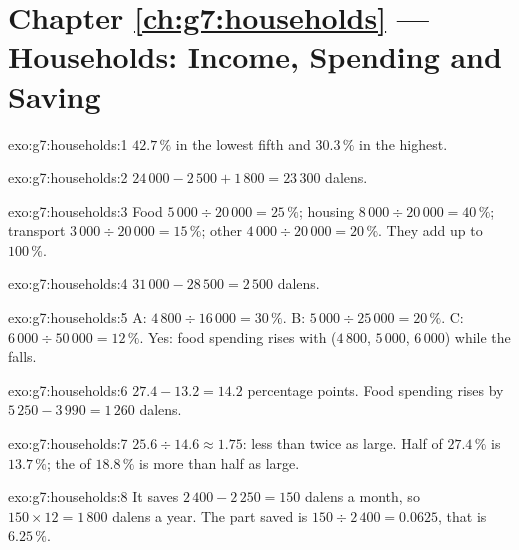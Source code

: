 \section*{Chapter \ref{ch:g7:households} --- Households: Income, Spending and Saving}

\begin{solution}{exo:g7:households:1}
$42.7\,\%$ in the lowest fifth and $30.3\,\%$ in the highest.
\end{solution}

\begin{solution}{exo:g7:households:2}
$24\,000 - 2\,500 + 1\,800 = 23\,300$ dalens.
\end{solution}

\begin{solution}{exo:g7:households:3}
Food $5\,000 \div 20\,000 = 25\,\%$; housing $8\,000 \div 20\,000 = 40\,\%$; transport
$3\,000 \div 20\,000 = 15\,\%$; other $4\,000 \div 20\,000 = 20\,\%$. They add up to $100\,\%$.
\end{solution}

\begin{solution}{exo:g7:households:4}
$31\,000 - 28\,500 = 2\,500$ dalens.
\end{solution}

\begin{solution}{exo:g7:households:5}
A: $4\,800 \div 16\,000 = 30\,\%$. B: $5\,000 \div 25\,000 = 20\,\%$. C: $6\,000 \div 50\,000 =
12\,\%$. Yes: food spending rises with  ($4\,800$, $5\,000$, $6\,000$) while the 
falls.
\end{solution}

\begin{solution}{exo:g7:households:6}
$27.4 - 13.2 = 14.2$ percentage points. Food spending rises by $5\,250 - 3\,990 = 1\,260$ dalens.
\end{solution}

\begin{solution}{exo:g7:households:7}
$25.6 \div 14.6 \approx 1.75$: less than twice as large. Half of $27.4\,\%$ is $13.7\,\%$; the
 of $18.8\,\%$ is more than half as large.
\end{solution}

\begin{solution}{exo:g7:households:8}
It saves $2\,400 - 2\,250 = 150$ dalens a month, so $150 \times 12 = 1\,800$ dalens a year. The
part saved is $150 \div 2\,400 = 0.0625$, that is $6.25\,\%$.
\end{solution}

